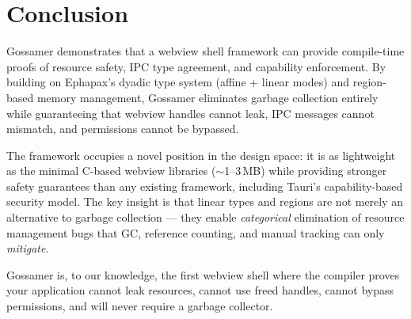 \documentclass[11pt,a4paper]{article}
\theoremstyle{definition}
\begin{document}
\section{Conclusion}
\label{sec:conclusion}

Gossamer demonstrates that a webview shell framework can provide
compile-time proofs of resource safety, IPC type agreement, and
capability enforcement. By building on Ephapax's dyadic type system
(affine + linear modes) and region-based memory management, Gossamer
eliminates garbage collection entirely while guaranteeing that webview
handles cannot leak, IPC messages cannot mismatch, and permissions
cannot be bypassed.

The framework occupies a novel position in the design space: it is as
lightweight as the minimal C-based webview libraries ($\sim$1--3\,MB)
while providing stronger safety guarantees than any existing framework,
including Tauri's capability-based security model. The key insight is
that linear types and regions are not merely an alternative to garbage
collection --- they enable \emph{categorical} elimination of resource
management bugs that GC, reference counting, and manual tracking can
only \emph{mitigate}.

Gossamer is, to our knowledge, the first webview shell where the
compiler proves your application cannot leak resources, cannot use
freed handles, cannot bypass permissions, and will never require a
garbage collector.


\end{document}

